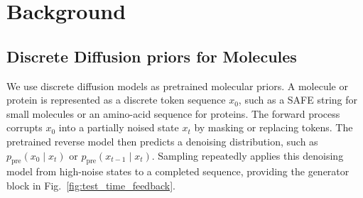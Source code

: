 \documentclass{article}
\begin{document}






% 
% 






\iffalse

\section{Background}\label{sec:related}



\subsection{Discrete Diffusion priors for Molecules}

We use discrete diffusion models as pretrained molecular priors. A molecule or protein is represented as a discrete token sequence $x_0$, such as a SAFE string for small molecules or an amino-acid sequence for proteins. The forward process corrupts $x_0$ into a partially noised state $x_t$ by masking or replacing tokens. The pretrained reverse model then predicts a denoising distribution, such as $p_{\mathrm{pre}}(x_0 \mid x_t)$ or $p_{\mathrm{pre}}(x_{t-1}\mid x_t)$. Sampling repeatedly applies this denoising model from high-noise states to a completed sequence, providing the generator block in Fig.~\ref{fig:test_time_feedback}.
\end{document}
